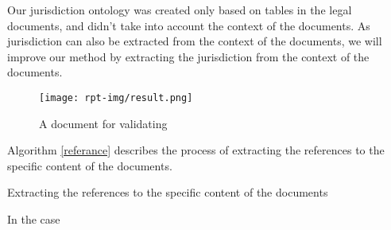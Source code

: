 \begin{algorithm}
Our jurisdiction ontology was created only based on tables in the legal documents, and didn't take into account the context of the documents. As jurisdiction can also be extracted from the context of the documents, we will improve our method by extracting the jurisdiction from the context of the documents.

\begin{figure}[H]
    \centering
    \texttt{[image: rpt-img/result.png]}
    \caption{A document for validating}
    \label{fig:docex}
    \end{figure}

    Algorithm \ref{referance} describes the process of extracting the references to the specific content of the documents.

    \begin{algorithm}[H]
    \label{referance}
        \caption{Extracting the references to the specific content of the documents}
    \end{algorithm}
    
    In the case 
    

\end{algorithm}
